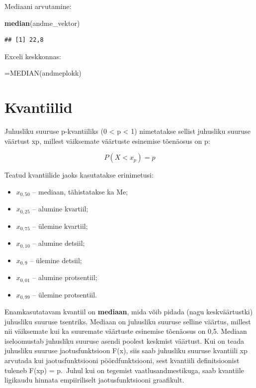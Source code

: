 \documentclass[
]{book}
\newenvironment{Shaded}{\begin{snugshade}}{\end{snugshade}}
\newcommand{\FunctionTok}[1]{\textcolor[rgb]{0.13,0.29,0.53}{\textbf{#1}}}
\newcommand{\NormalTok}[1]{#1}
\providecommand{\tightlist}{%
  \setlength{\itemsep}{0pt}\setlength{\parskip}{0pt}}
\renewenvironment{Shaded} {\begin{snugshade}\footnotesize} {\end{snugshade}}
\begin{document}
Mediaani arvutamine:

\begin{Shaded}
\begin{Highlighting}[]
\FunctionTok{median}\NormalTok{(andme\_vektor)}
\end{Highlighting}
\end{Shaded}

\begin{verbatim}
## [1] 22,8
\end{verbatim}

Exceli keskkonnas:

\begin{Shaded}
\begin{Highlighting}[]
\NormalTok{=MEDIAN(andmeplokk)}
\end{Highlighting}
\end{Shaded}

\section{Kvantiilid}\label{kvantiilid}

Juhusliku suuruse p-kvantiiliks (0 \textless{} p \textless{} 1) nimetatakse sellist juhusliku suuruse väärtust xp, millest väiksemate väärtuste esinemise tõenäosus on p:

\[ P (X < x_p) = p \]

Teatud kvantiilide jaoks kasutatakse erinimetusi:

\begin{itemize}
\tightlist
\item
  \(x_{0,50}\) -- mediaan, tähistatakse ka Me;
\item
  \(x_{0,25}\) -- alumine kvartiil;
\item
  \(x_{0,75}\) -- ülemine kvartiil;
\item
  \(x_{0,10}\) -- alumine detsiil;
\item
  \(x_{0,9}\) -- ülemine detsiil;
\item
  \(x_{0,01}\) -- alumine protsentiil;
\item
  \(x_{0,99}\) -- ülemine protsentiil.
\end{itemize}

Enamkasutatavam kvantiil on \textbf{mediaan}, mida võib pidada (nagu keskväärtustki) juhusliku suuruse tsentriks. Mediaan on juhusliku suuruse selline väärtus, millest nii väiksemate kui ka suuremate väärtuste esinemise tõenäosus on 0,5. Mediaan iseloomustab juhusliku suuruse asendi poolest keskmist väärtust.
Kui on teada juhusliku suuruse jaotusfunktsioon F(x), siis saab juhusliku suuruse kvantiili xp arvutada kui jaotusfunktsiooni pöördfunktsiooni, sest kvantiili definitsioonist tuleneb F(xp) = p.~Juhul kui on tegemist vaatlusandmestikuga, saab kvantiile ligikaudu hinnata empiiriliselt jaotusfunktsiooni graafikult.
\end{document}
